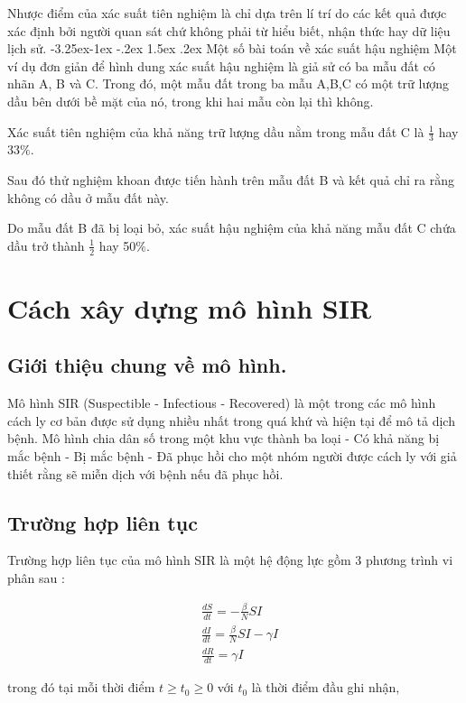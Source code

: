 \documentclass[a4paper]{article}
\makeatletter
\newcounter {subsubsubsection}[subsubsection]
\newcommand\subsubsubsection{\@startsection{subsubsubsection}{4}{\z@}%
                                     {-3.25ex\@plus -1ex \@minus -.2ex}%
                                     {1.5ex \@plus .2ex}%
                                     {\normalfont\normalsize\bfseries}}
\makeatother
\begin{document}
	Nhược điểm của xác suất tiên nghiệm là chỉ dựa trên lí trí do các kết quả được xác định bởi người quan sát chứ không phải từ hiểu biết, nhận thức hay dữ liệu lịch sử.
\subsubsubsection{Một số bài toán về xác suất hậu nghiệm}  
	Một ví dụ đơn giản để hình dung xác suất hậu nghiệm là giả sử có ba mẫu đất có nhãn A, B và C. Trong đó, một mẫu đất trong ba mẫu A,B,C có một trữ lượng dầu bên dưới bề mặt của nó, trong khi hai mẫu còn lại thì không. 
	
	Xác suất tiên nghiệm của khả năng trữ lượng dầu nằm trong mẫu đất C là $\frac{1}{3}$ hay 33$\%$. 
	
	Sau đó thử nghiệm khoan được tiến hành trên mẫu đất B và kết quả chỉ ra rằng không có dầu ở mẫu đất này. 
	
	Do mẫu đất B đã bị loại bỏ, xác suất hậu nghiệm của khả năng mẫu đất C chứa dầu trở thành $\frac{1}{2}$ hay 50$\%$. 



\section{Cách xây dựng mô hình SIR}\label{bai_tap}
	\subsection{Giới thiệu chung về mô hình.}  
Mô hình SIR (Suspectible - Infectious - Recovered) là một trong các mô hình cách ly cơ bản được sử dụng nhiều nhất trong quá khứ và hiện tại để mô tả dịch bệnh. Mô hình chia dân số trong một khu vực thành ba loại - Có khả năng bị mắc bệnh - Bị mắc bệnh - Đã phục hồi  cho một nhóm người được cách ly với giả thiết rằng sẽ miễn dịch với bệnh nếu đã phục hồi. 
	\subsection{Trường hợp liên tục} Trường hợp liên tục của mô hình SIR là một hệ động lực gồm 3 phương trình vi phân sau :

	\begin{align} 
	\label{eqn:1}
	&\frac{dS}{dt} = - \frac{\beta}{N}SI \\
	\label{eqn:2}
	&\frac{dI}{dt} 	= \frac{\beta}{N}SI - \gamma I  \\ 	
	\label{eqn:3}
	&\frac{dR}{dt} = \gamma I 
	\end{align}

trong đó tại mỗi thời điểm $ t \geq t_0 \geq 0 $ với $ t_0 $ là thời điểm đầu ghi nhận, 
\end{document}
